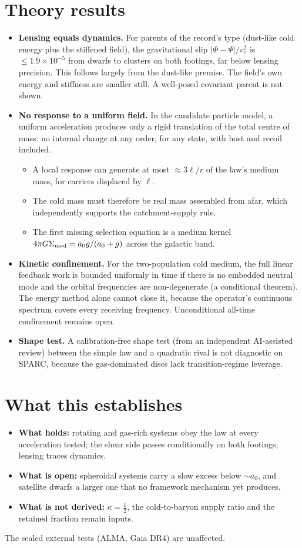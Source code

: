 \documentclass[10pt]{article}
\begin{document}
\section{Theory results}
\begin{itemize}
\item \textbf{Lensing equals dynamics.} For parents of the record's type (dust-like cold energy plus the stiffened field), the gravitational slip $|\Phi-\Psi|/v_c^2$ is $\le1.9\times10^{-5}$ from dwarfs to clusters on both footings, far below lensing precision. This follows largely from the dust-like premise. The field's own energy and stiffness are smaller still. A well-posed covariant parent is not shown.
\item \textbf{No response to a uniform field.} In the candidate particle model, a uniform acceleration produces only a rigid translation of the total centre of mass: no internal change at any order, for any state, with host and recoil included.
  \begin{itemize}
  \item A local response can generate at most $\approx3\ell/r$ of the law's medium mass, for carriers displaced by $\ell$.
  \item The cold mass must therefore be real mass assembled from afar, which independently supports the catchment-supply rule.
  \item The first missing selection equation is a medium kernel $4\pi G\Sigma_{\rm med}=a_0g/(a_0+g)$ across the galactic band.
  \end{itemize}
\item \textbf{Kinetic confinement.} For the two-population cold medium, the full linear feedback work is bounded uniformly in time if there is no embedded neutral mode and the orbital frequencies are non-degenerate (a conditional theorem). The energy method alone cannot close it, because the operator's continuous spectrum covers every receiving frequency. Unconditional all-time confinement remains open.
\item \textbf{Shape test.} A calibration-free shape test (from an independent AI-assisted review) between the simple law and a quadratic rival is not diagnostic on SPARC, because the gas-dominated discs lack transition-regime leverage.
\end{itemize}

\section{What this establishes}
\begin{itemize}
\item \textbf{What holds:} rotating and gas-rich systems obey the law at every acceleration tested; the shear side passes conditionally on both footings; lensing traces dynamics.
\item \textbf{What is open:} spheroidal systems carry a slow excess below $\sim a_0$, and satellite dwarfs a larger one that no framework mechanism yet produces.
\item \textbf{What is not derived:} $\kappa=\tfrac12$, the cold-to-baryon supply ratio and the retained fraction remain inputs.
\end{itemize}
The sealed external tests (ALMA, Gaia DR4) are unaffected.
\end{document}
